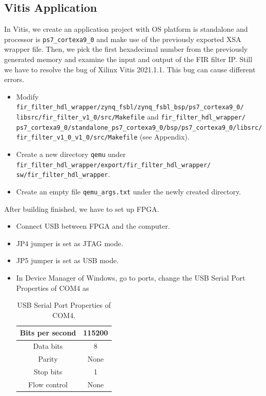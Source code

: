 \documentclass[a4paper]{article}
\begin{document}
\subsection{Vitis Application}
In Vitis, we create an application project with OS platform is standalone and processor is \texttt{ps7\_cortexa9\_0} and make use of the previously exported XSA wrapper file. Then, we pick the first hexadecimal number from the previously generated memory and examine the input and output of the FIR filter IP. Still we have to resolve the bug of Xilinx Vitis 2021.1.1. This bug can cause different errors.
\begin{itemize}
    \item Modify \texttt{fir\_filter\_hdl\_wrapper/zynq\_fsbl/zynq\_fsbl\_bsp/ps7\_cortexa9\_0/ libsrc/fir\_filter\_v1\_0/src/Makefile} and \texttt{fir\_filter\_hdl\_wrapper/
    ps7\_cortexa9\_0/standalone\_ps7\_cortexa9\_0/bsp/ps7\_cortexa9\_0/libsrc/
    fir\_filter\_v1\_0\_v1\_0/src/Makefile} (see Appendix).
    \item Create a new directory \texttt{qemu} under \texttt{fir\_filter\_hdl\_wrapper/export/fir\_filter\_hdl\_wrapper/
    sw/fir\_filter\_hdl\_wrapper}.
    \item Create an empty file \texttt{qemu\_args.txt} under the newly created directory.
\end{itemize}
After building finished, we have to set up FPGA.
\begin{itemize}
    \item Connect USB between FPGA and the computer.
    \item JP4 jumper is set as JTAG mode.
    \item JP5 jumper is set as USB mode.
    \item In Device Manager of Windows, go to ports, change the USB Serial Port Properties of COM4 as
\begin{table}[H]
    \centering
    \begin{tabular}{|c|c|}
        \hline
        Bits per second&115200\\
        \hline
        Data bits&8\\
        \hline
        Parity&None\\
        \hline
        Stop bits&1\\
        \hline
        Flow control&None\\
        \hline
    \end{tabular}
    \caption{USB Serial Port Properties of COM4.}
\end{table}
\end{itemize}
\end{document}
